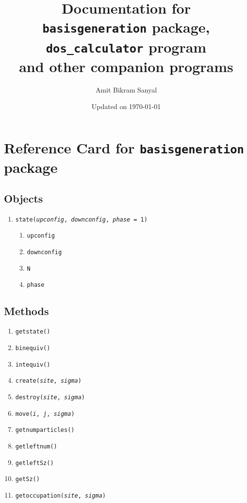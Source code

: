 \documentclass[]{book}
\title{Documentation for\\ \texttt{basisgeneration} package, \texttt{dos\_calculator} program\\
	and other companion programs}
\author{Amit Bikram Sanyal}
\date{Updated on \today}
\begin{document}
\maketitle

\frontmatter

\section*{Reference Card for \texttt{basisgeneration} package}

\subsection*{Objects}

\begin{enumerate}
\item \texttt{state(\textit{upconfig}, \textit{downconfig}, \textit{phase} = 1)}
\begin{enumerate}
	\item \texttt{upconfig}
	\item \texttt{downconfig}
	\item \texttt{N}
	\item \texttt{phase}
\end{enumerate}
\end{enumerate}

\subsection*{Methods}

\begin{enumerate}
\item \texttt{getstate()}
\item \texttt{binequiv()}
\item \texttt{intequiv()}
\item \texttt{create(\textit{site}, \textit{sigma})}
\item \texttt{destroy(\textit{site}, \textit{sigma})}
\item \texttt{move(\textit{i}, \textit{j}, \textit{sigma})}
\item \texttt{getnumparticles()}
\item \texttt{getleftnum()}
\item \texttt{getleftSz()}
\item \texttt{getSz()}
\item \texttt{getoccupation(\textit{site}, \textit{sigma})}
\end{enumerate}
\end{document}
